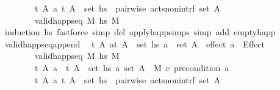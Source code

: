 \begin{isabellebody}
\ \ \ \ \ \ \ \ {\isacharparenleft}{\kern0pt}{\isasymAnd}t\ A\ a{\isachardot}{\kern0pt}\ {\isacharparenleft}{\kern0pt}t{\isacharcomma}{\kern0pt}\ A{\isacharparenright}{\kern0pt}\ {\isasymin}\ set\ hs\ {\isasymLongrightarrow}\ pairwise\ acts{\isacharunderscore}{\kern0pt}non{\isacharunderscore}{\kern0pt}intrf\ {\isacharparenleft}{\kern0pt}set\ A{\isacharparenright}{\kern0pt}{\isacharparenright}{\kern0pt}\ {\isasymrbrakk}\ {\isasymLongrightarrow}\isanewline
\ \ \ \ \ \ \ \ valid{\isacharunderscore}{\kern0pt}happ{\isacharunderscore}{\kern0pt}seq\ M\ hs\ M{\isachardoublequoteclose}\ \ \isanewline
%
\isadelimproof
\ \ %
\endisadelimproof
%
\isatagproof
{}\isamarkupfalse%
\ {\isacharparenleft}{\kern0pt}induction\ hs{\isacharparenright}{\kern0pt}\ {\isacharparenleft}{\kern0pt}fastforce\ simp\ del{\isacharcolon}{\kern0pt}\ apply{\isacharunderscore}{\kern0pt}happ{\isachardot}{\kern0pt}simps\ simp\ add{\isacharcolon}{\kern0pt}\ empty{\isacharunderscore}{\kern0pt}happ{\isacharparenright}{\kern0pt}{\isacharplus}{\kern0pt}%
\endisatagproof
{\isafoldproof}%
%
\isadelimproof
\isanewline
%
\endisadelimproof
\isanewline
{}\isamarkupfalse%
\ valid{\isacharunderscore}{\kern0pt}happ{\isacharunderscore}{\kern0pt}seq{\isacharunderscore}{\kern0pt}append{\isacharunderscore}{\kern0pt}{}{\isacharcolon}{\kern0pt}\isanewline
\ \ {\isachardoublequoteopen}{\isasymlbrakk}{\isasymAnd}t\ A\ a{\isachardot}{\kern0pt}{\isasymlbrakk}{\isacharparenleft}{\kern0pt}t{\isacharcomma}{\kern0pt}\ A{\isacharparenright}{\kern0pt}\ {\isasymin}\ set\ hs{}{\isacharsemicolon}{\kern0pt}\ a\ {\isasymin}\ set\ A{\isasymrbrakk}\ {\isasymLongrightarrow}\ effect\ a\ {\isacharequal}{\kern0pt}\ Effect\ {\isacharbrackleft}{\kern0pt}{\isacharbrackright}{\kern0pt}\ {\isacharbrackleft}{\kern0pt}{\isacharbrackright}{\kern0pt}{\isacharsemicolon}{\kern0pt}\isanewline
\ \ \ \ \ \ \ \ valid{\isacharunderscore}{\kern0pt}happ{\isacharunderscore}{\kern0pt}seq\ M\ hs{}\ M{\isacharprime}{\kern0pt}{\isacharsemicolon}{\kern0pt}\isanewline
\ \ \ \ \ \ \ \ {\isacharparenleft}{\kern0pt}{\isasymAnd}t\ A\ a{\isachardot}{\kern0pt}\ {\isasymlbrakk}\ {\isacharparenleft}{\kern0pt}t{\isacharcomma}{\kern0pt}\ A{\isacharparenright}{\kern0pt}\ {\isasymin}\ set\ hs{}{\isacharsemicolon}{\kern0pt}\ a{\isasymin}\ set\ A{\isasymrbrakk}\ {\isasymLongrightarrow}\ M{\isacharprime}{\kern0pt}\ \isactrlsup c{\isasymTTurnstile}\isactrlsub {\isacharequal}{\kern0pt}\ precondition\ a{\isacharparenright}{\kern0pt}{\isacharsemicolon}{\kern0pt}\isanewline
\ \ \ \ \ \ \ \ {\isacharparenleft}{\kern0pt}{\isasymAnd}t\ A\ a{\isachardot}{\kern0pt}\ {\isacharparenleft}{\kern0pt}t{\isacharcomma}{\kern0pt}\ A{\isacharparenright}{\kern0pt}\ {\isasymin}\ set\ hs{}\ {\isasymLongrightarrow}\ pairwise\ acts{\isacharunderscore}{\kern0pt}non{\isacharunderscore}{\kern0pt}intrf\ {\isacharparenleft}{\kern0pt}set\ A{\isacharparenright}{\kern0pt}{\isacharparenright}{\kern0pt}\ {\isasymrbrakk}\ {\isasymLongrightarrow}\isanewline

\end{isabellebody}
